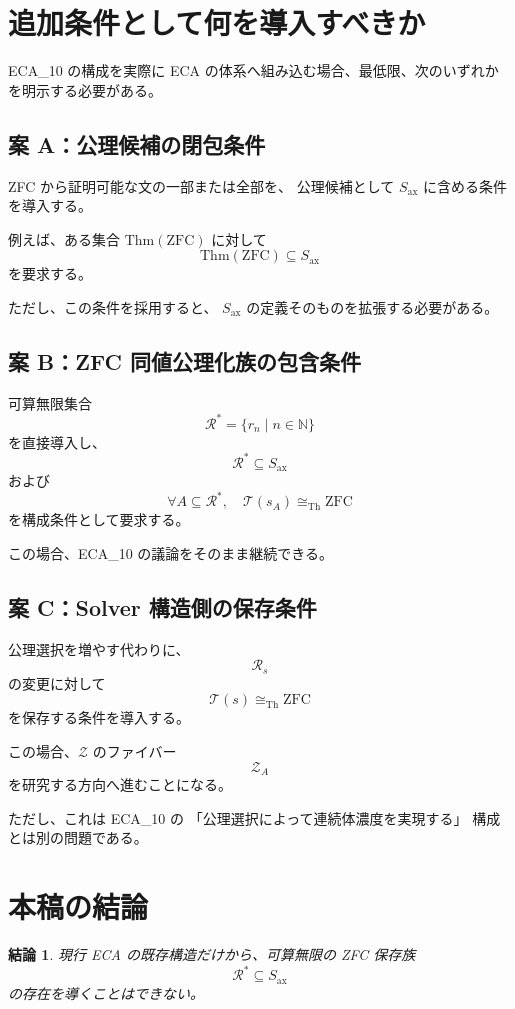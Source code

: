 \documentclass[a4paper,11pt]{article}
\newtheorem{conclusion}[definition]{結論}
\newcommand{\Ax}{S_{\mathrm{ax}}}
\begin{document}
\section{追加条件として何を導入すべきか}

ECA_10 の構成を実際に ECA の体系へ組み込む場合、最低限、次のいずれかを明示する必要がある。

\subsection{案 A：公理候補の閉包条件}

ZFC から証明可能な文の一部または全部を、
公理候補として $\Ax$ に含める条件を導入する。

例えば、ある集合 $\mathrm{Thm}(\mathrm{ZFC})$ に対して
\[
\mathrm{Thm}(\mathrm{ZFC})\subseteq\Ax
\]
を要求する。

ただし、この条件を採用すると、
$\Ax$ の定義そのものを拡張する必要がある。

\subsection{案 B：ZFC 同値公理化族の包含条件}

可算無限集合
\[
\mathcal{R}^{*}
=
\{r_n\mid n\in\mathbb{N}\}
\]
を直接導入し、
\[
\mathcal{R}^{*}\subseteq\Ax
\]
および
\[
\forall A\subseteq\mathcal{R}^{*},
\quad
\mathcal{T}(s_A)\cong_{\mathrm{Th}}\mathrm{ZFC}
\]
を構成条件として要求する。

この場合、ECA_10 の議論をそのまま継続できる。

\subsection{案 C：Solver 構造側の保存条件}

公理選択を増やす代わりに、
\[
\mathcal{R}_s
\]
の変更に対して
\[
\mathcal{T}(s)\cong_{\mathrm{Th}}\mathrm{ZFC}
\]
を保存する条件を導入する。

この場合、$\mathcal{Z}$ のファイバー
\[
\mathcal{Z}_A
\]
を研究する方向へ進むことになる。

ただし、これは ECA_10 の
「公理選択によって連続体濃度を実現する」
構成とは別の問題である。

\section{本稿の結論}

\begin{conclusion}
現行 ECA の既存構造だけから、可算無限の
ZFC 保存族
\[
\mathcal{R}^{*}\subseteq\Ax
\]
の存在を導くことはできない。
\end{conclusion}
\end{document}
